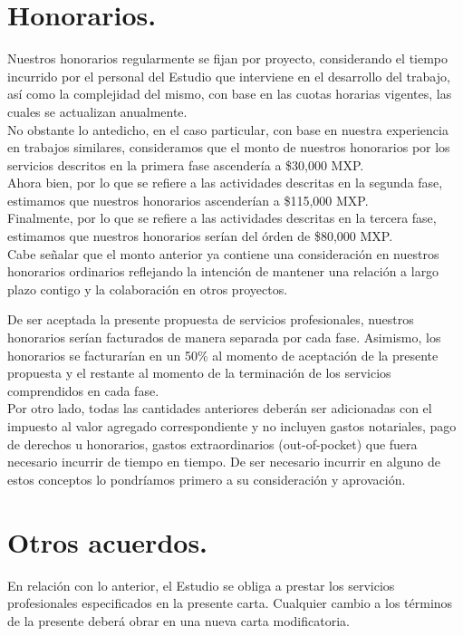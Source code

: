 \documentclass[5pt,letter]{report}
\begin{document}

\section*{Honorarios.} %
Nuestros honorarios regularmente se fijan por proyecto, considerando el tiempo incurrido por 
el personal del Estudio que interviene en el desarrollo del trabajo, así como la complejidad del 
mismo, con base en las cuotas horarias vigentes, las cuales se actualizan anualmente. \\ 

No obstante lo antedicho, en el caso particular, con base en nuestra experiencia en trabajos 
similares, consideramos que el monto de nuestros honorarios por los servicios descritos en la 
primera fase ascendería a \$30,000 MXP.  \\ 

Ahora bien, por lo que se refiere a las actividades descritas en la segunda fase, estimamos que 
nuestros honorarios ascenderían a \$115,000 MXP. \\ 

Finalmente, por lo que se refiere a las actividades descritas en la tercera fase, estimamos que 
nuestros honorarios serían del órden de \$80,000 MXP. \\ 

Cabe señalar que el monto anterior ya contiene una consideración en nuestros honorarios 
ordinarios reflejando la intención de mantener una relación a largo plazo contigo y la 
colaboración en otros proyectos.

De ser aceptada la presente propuesta de servicios profesionales, nuestros honorarios serían 
facturados de manera separada por cada fase. Asimismo, los honorarios se facturarían en un 
50\% al momento de aceptación de la presente propuesta y el restante al momento de la 
terminación de los servicios comprendidos en cada fase. \\
 
Por otro lado, todas las cantidades anteriores deberán ser adicionadas con el impuesto al valor 
agregado correspondiente y no incluyen gastos notariales, pago de derechos u honorarios, 
gastos extraordinarios (out-of-pocket) que fuera necesario incurrir de tiempo en tiempo. De ser 
necesario incurrir en alguno de estos conceptos lo pondríamos primero a su consideración y 
aprovación.

\section*{Otros acuerdos.} %
En relación con lo anterior, el Estudio se obliga a prestar los servicios profesionales especificados 
en la presente carta. Cualquier cambio a los términos de la presente deberá obrar en una nueva 
carta modificatoria.  \\ 
\end{document}

